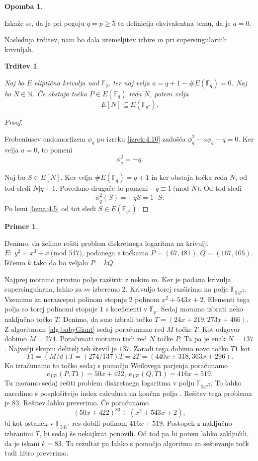 \documentclass[12pt,a4paper,twoside]{article}
\theoremstyle{definition} %
\newtheorem{primer}[definicija]{Primer}
\newtheorem{opomba}[definicija]{Opomba}
\theoremstyle{plain} %
\newtheorem{trditev}[definicija]{Trditev}
\numberwithin{equation}{section}  %
\newcommand{\N}{\mathbb N}
\newcommand{\F}{\mathbb F}
\newcommand{\E}[1]{E({#1})}
\newcommand{\MOD}[1]{\ \text{(mod }{#1}\text{)}}
\begin{document}
\begin{opomba}~

Izkaže se, da je pri pogoju $q=p \geq 5$ ta definicija ekvivalentna temu, da je $a=0$.
\end{opomba}
Naslednja trditev, nam bo dala utemeljitev izbire $m$ pri supersingularnih krivuljah.

\begin{trditev}~

Naj bo $E$ eliptična krivulja nad $\F_q$, ter naj velja $a = q+1-\#\E{\F_q} =0$. Naj bo $N\in \N$. Če obstaja točka $P \in \E{\F_q}$ reda $N$, potem velja
$$E[N] \subseteq \E{\F_{q^2}}.$$
\end{trditev}

\begin{proof}~

 Frobeniusev endomorfizem $\phi_q$ po izreku \ref{izrek:4.10} zadošča $\phi^2_q-a\phi_q+q=0$. Ker velja $a = 0$, to pomeni
$$\phi^2_q = -q.$$

Naj bo $S \in E[N]$. Ker velja $\#\E{\F_q} = q+1$ in ker obstaja točka reda $N$, od tod sledi $N|q+1$. Povedano drugače to pomeni $-q \equiv 1 \MOD{N}$. Od tod sledi
$$\phi^2_q(S) = -qS = 1\cdot S.$$
Po lemi \ref{lema:4.5} od tot sledi $S \in \E{\F_{q^2}}$. 
\end{proof}

\begin{primer}~

Denimo, da želimo rešiti problem diskretnega logaritma na krivulji $E: \ y^2 = x^3+x \MOD{547}$, podanega s točkama $P=(67,481),Q = (167,405)$. Iščemo $k$ tako da bo veljalo $P = kQ$.

Najprej moramo prvotno polje razširiti z nekim $m$. Ker je podana krivulja supersingularna, lahko za $m$ izberemo $2$. Krivuljo torej razširimo na polje $\F_{547^2}$. Vzemimo za nerazcepni polinom stopnje $2$ polinom $x^2+543x+2$. Elementi tega polja so torej polinomi stopnje $1$ s koeficienti v $\F_p$.
Sedaj moramo izbrati neko naključno točko $T$. Denimo, da smo izbrali točko $T = (24x+219,273x+466)$. Z algoritmom \ref{alg:babyGiant} sedaj poračunamo red $M$ točke $T$. Kot odgovor dobimo $M = 274$. Poračunati moramo tudi red $N$ točke $P$. Ta pa je enak $N = 137$. Največji skupni delitelj teh števil je $137$. Zaradi tega dobimo novo točko $T1$ kot 
$$T1 = (M/d) T = (274/137)T = 2T = (440x+318,363x+296).$$
Ko izračunamo to točko sedaj s pomočjo Weilovega parjenja poračunamo
$$e_{137}(P,T1) = 50x+422, \ e_{137}(Q,T1) = 416x+519.$$
Tu moramo sedaj rešiti problem diskretnega logaritma v polju $\F_{547^2}$. To lahko naredimo s posplošitvijo index calculusa na končna polja \cite{Henri2005}. Rešitev tega problema je $83$. Rešitev lahko preverimo.
Če poračunamo
$$(50x+422)^{83} \div (x^2+543x+2),$$
bi kot ostanek v $\F_{547^2}$ res dobili polinom $416x+519$.
Postopek z naključno izbranimi $T$, bi sedaj še nekajkrat ponovili. Od tod pa bi potem lahko zaključili, da je iskani $k=83$. Ta rezultat pa lahko s pomočjo algoritma za seštevanje točk tudi hitro preverimo.
\end{primer}
\end{document}
